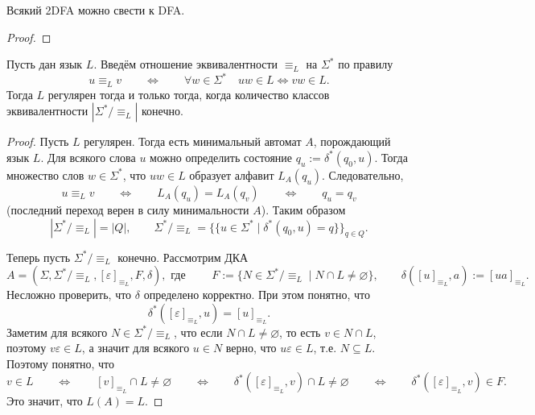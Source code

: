 \documentclass[12pt,a4paper]{article}
\begin{document}
    \begin{theorem}
        Всякий 2DFA можно свести к DFA.
    \end{theorem}

    \begin{proof}
    \end{proof}

    \begin{theorem}
        Пусть дан язык $L$. Введём отношение эквивалентности $\equiv_L$ на $\Sigma^*$ по правилу
        \[u \equiv_L v \qquad \Longleftrightarrow \qquad \forall w \in \Sigma^* \quad uw \in L \Leftrightarrow vw \in L.\]
        Тогда $L$ регулярен тогда и только тогда, когда количество классов эквивалентности $|\Sigma^*/{\equiv_L}|$ конечно.
    \end{theorem}

    \begin{proof}
        Пусть $L$ регулярен. Тогда есть минимальный автомат $A$, порождающий язык $L$. Для всякого слова $u$ можно определить состояние $q_u := \delta^*(q_0, u)$. Тогда множество слов $w \in \Sigma^*$, что $uw \in L$ образует алфавит $L_A(q_u)$. Следовательно,
        \[
            u \equiv_L v
            \qquad \Longleftrightarrow \qquad
            L_A(q_u) = L_A(q_v)
            \qquad \Longleftrightarrow \qquad
            q_u = q_v
        \]
        (последний переход верен в силу минимальности $A$). Таким образом
        \[|\Sigma^*/{\equiv_L}| = |Q|, \qquad \Sigma^*/{\equiv_L} = \{\{u \in \Sigma^* \mid \delta^*(q_0, u) = q\}\}_{q \in Q}.\]

        Теперь пусть $\Sigma^*/{\equiv_L}$ конечно. Рассмотрим ДКА
        \[
            A = (\Sigma, \Sigma^*/{\equiv_L}, [\varepsilon]_{\equiv_L}, F, \delta), \text{ где }
            \qquad
            F := \{N \in \Sigma^*/{\equiv_L} \mid N \cap L \neq \varnothing\},
            \qquad
            \delta([u]_{\equiv_L}, a) := [ua]_{\equiv_L}.
        \]
        Несложно проверить, что $\delta$ определено корректно. При этом понятно, что
        \[\delta^*([\varepsilon]_{\equiv_L}, u) = [u]_{\equiv_L}.\]
        Заметим для всякого $N \in \Sigma^*/{\equiv_L}$, что если $N \cap L \neq \varnothing$, то есть $v \in N \cap L$, поэтому $v\varepsilon \in L$, а значит для всякого $u \in N$ верно, что $u\varepsilon \in L$, т.е. $N \subseteq L$. Поэтому понятно, что
        \[
            v \in L
            \qquad \Longleftrightarrow \qquad
            [v]_{\equiv_L} \cap L \neq \varnothing
            \qquad \Longleftrightarrow \qquad
            \delta^*([\varepsilon]_{\equiv_L}, v) \cap L \neq \varnothing
            \qquad \Longleftrightarrow \qquad
            \delta^*([\varepsilon]_{\equiv_L}, v) \in F.
        \]
        Это значит, что $L(A) = L$.
    \end{proof}
\end{document}
